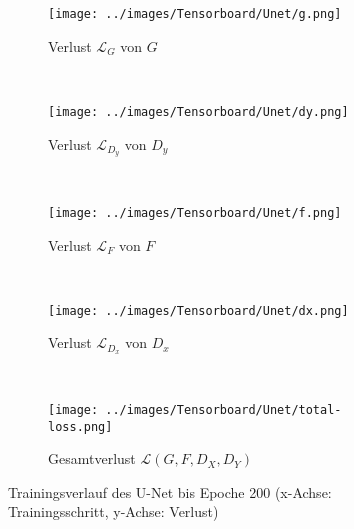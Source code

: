 \begin{figure}[H]
  \centering
  \begin{subfigure}[b]{\textwidth}
    \centering
    \texttt{[image: ../images/Tensorboard/Unet/g.png]}
    \caption{Verlust $\mathcal{L}_G$ von $G$}
\end{subfigure} \\
\begin{subfigure}[b]{\textwidth}
  \centering
  \texttt{[image: ../images/Tensorboard/Unet/dy.png]}
  \caption{Verlust $\mathcal{L}_{D_y}$ von $D_y$}
\end{subfigure} \\
\begin{subfigure}[b]{\textwidth}
  \centering
  \texttt{[image: ../images/Tensorboard/Unet/f.png]}
  \caption{Verlust $\mathcal{L}_F$ von $F$}
\end{subfigure} \\
  \begin{subfigure}[b]{\textwidth}
      \centering
      \texttt{[image: ../images/Tensorboard/Unet/dx.png]}
      \caption{Verlust $\mathcal{L}_{D_x}$ von $D_x$}
  \end{subfigure} \\
  \begin{subfigure}[b]{\textwidth}
    \centering
    \texttt{[image: ../images/Tensorboard/Unet/total-loss.png]}
    \caption{Gesamtverlust $\mathcal{L}(G, F, D_X, D_Y)$}
  \end{subfigure}
  \caption{Trainingsverlauf des U-Net bis Epoche 200 (x-Achse: Trainingsschritt, y-Achse: Verlust)}
  \label{fig:unet-tensorboard}
\end{figure}

